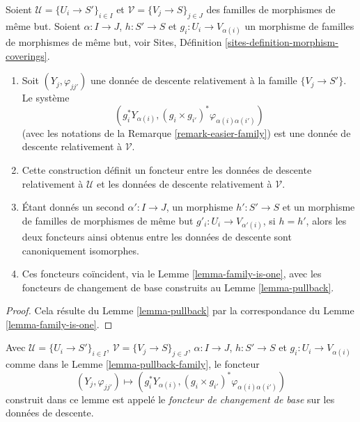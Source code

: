 \begin{lemma}
\label{lemma-pullback-family}
Soient $\mathcal{U} = \{U_i \to S'\}_{i \in I}$ et
$\mathcal{V} = \{V_j \to S\}_{j \in J}$ des familles de morphismes de même
but. Soient $\alpha : I \to J$, $h : S' \to S$ et
$g_i : U_i \to V_{\alpha(i)}$ un morphisme de familles de morphismes de même
but, voir Sites, Définition
\ref{sites-definition-morphism-coverings}.
\begin{enumerate}
\item Soit $(Y_j, \varphi_{jj'})$ une donnée de descente relativement à la
famille $\{V_j \to S'\}$. Le système
$$
\left(
g_i^*Y_{\alpha(i)},
(g_i \times g_{i'})^*\varphi_{\alpha(i)\alpha(i')}
\right)
$$
(avec les notations de la Remarque \ref{remark-easier-family}) est une donnée
de descente relativement à $\mathcal{V}$.
\item Cette construction définit un foncteur entre les données de descente
relativement à $\mathcal{U}$ et les données de descente relativement à
$\mathcal{V}$.
\item Étant donnés un second $\alpha' : I \to J$, un morphisme
$h' : S' \to S$ et un morphisme de familles de morphismes de même but
$g'_i : U_i \to V_{\alpha'(i)}$, si $h = h'$, alors les deux foncteurs ainsi
obtenus entre les données de descente sont canoniquement isomorphes.
\item Ces foncteurs coïncident, via le
Lemme \ref{lemma-family-is-one}, avec les foncteurs de changement de base
construits au Lemme \ref{lemma-pullback}.
\end{enumerate}
\end{lemma}

\begin{proof}
Cela résulte du Lemme \ref{lemma-pullback} par la correspondance du
Lemme \ref{lemma-family-is-one}.
\end{proof}

\begin{definition}
\label{definition-pullback-functor-family}
Avec $\mathcal{U} = \{U_i \to S'\}_{i \in I}$,
$\mathcal{V} = \{V_j \to S\}_{j \in J}$, $\alpha : I \to J$,
$h : S' \to S$ et $g_i : U_i \to V_{\alpha(i)}$ comme dans le
Lemme \ref{lemma-pullback-family}, le foncteur
$$
(Y_j, \varphi_{jj'}) \longmapsto
(g_i^*Y_{\alpha(i)}, (g_i \times g_{i'})^*\varphi_{\alpha(i)\alpha(i')})
$$
construit dans ce lemme est appelé le {\it foncteur de changement de base}
sur les données de descente.
\end{definition}

